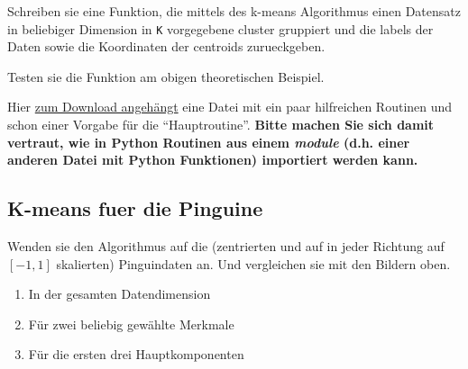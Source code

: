 \documentclass[]{book}
\newenvironment{Shaded}{\begin{snugshade}}{\end{snugshade}}
\providecommand{\tightlist}{%
  \setlength{\itemsep}{0pt}\setlength{\parskip}{0pt}}
\theoremstyle{definition}
\theoremstyle{definition}
\theoremstyle{definition}
\theoremstyle{definition}
\theoremstyle{remark}
\begin{document}
Schreiben sie eine Funktion, die mittels des k-means Algorithmus einen Datensatz in beliebiger Dimension in \texttt{K} vorgegebene cluster gruppiert und die labels der Daten sowie die Koordinaten der centroids zurueckgeben.

Testen sie die Funktion am obigen theoretischen Beispiel.

Hier \href{bilder/kmeans_utils.py}{zum Download angehängt} eine Datei mit ein paar hilfreichen Routinen und schon einer Vorgabe für die ``Hauptroutine''. \textbf{Bitte machen Sie sich damit vertraut, wie in Python Routinen aus einem \emph{module} (d.h. einer anderen Datei mit Python Funktionen) importiert werden kann.}

\begin{Shaded}
\begin{Highlighting}[]

\end{Highlighting}
\end{Shaded}

\hypertarget{k-means-fuer-die-pinguine}{%
\subsection{K-means fuer die Pinguine}\label{k-means-fuer-die-pinguine}}

Wenden sie den Algorithmus auf die (zentrierten und auf in jeder Richtung auf \([-1, 1]\) skalierten) Pinguindaten an. Und vergleichen sie mit den Bildern oben.

\begin{enumerate}
\def\labelenumi{\arabic{enumi}.}
\tightlist
\item
  In der gesamten Datendimension
\item
  Für zwei beliebig gewählte Merkmale
\item
  Für die ersten drei Hauptkomponenten
\end{enumerate}
\end{document}
